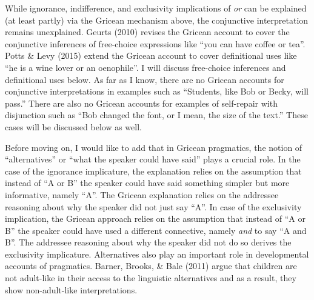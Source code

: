 \documentclass[oneside]{report}
\theoremstyle{definition}
\theoremstyle{definition}
\theoremstyle{definition}
\theoremstyle{remark}
\begin{document}
While ignorance, indifference, and exclusivity implications of \emph{or}
can be explained (at least partly) via the Gricean mechanism above, the
conjunctive interpretation remains unexplained. Geurts (2010) revises
the Gricean account to cover the conjunctive inferences of free-choice
expressions like ``you can have coffee or tea''. Potts \& Levy (2015)
extend the Gricean account to cover definitional uses like ``he is a
wine lover or an oenophile''. I will discuss free-choice inferences and
definitional uses below. As far as I know, there are no Gricean accounts
for conjunctive interpretations in examples such as ``Students, like Bob
or Becky, will pass.'' There are also no Gricean accounts for examples
of self-repair with disjunction such as ``Bob changed the font, or I
mean, the size of the text.'' These cases will be discussed below as
well.

Before moving on, I would like to add that in Gricean pragmatics, the
notion of ``alternatives'' or ``what the speaker could have said'' plays
a crucial role. In the case of the ignorance implicature, the
explanation relies on the assumption that instead of ``A or B'' the
speaker could have said something simpler but more informative, namely
``A''. The Gricean explanation relies on the addressee reasoning about
why the speaker did not just say ``A''. In case of the exclusivity
implication, the Gricean approach relies on the assumption that instead
of ``A or B'' the speaker could have used a different connective, namely
\emph{and} to say ``A and B''. The addressee reasoning about why the
speaker did not do so derives the exclusivity implicature. Alternatives
also play an important role in developmental accounts of pragmatics.
Barner, Brooks, \& Bale (2011) argue that children are not adult-like in
their access to the linguistic alternatives and as a result, they show
non-adult-like interpretations.
\end{document}
